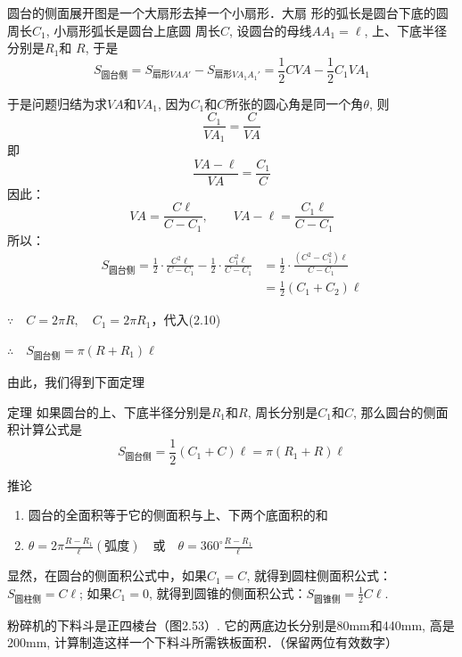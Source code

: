 圆台的侧面展开图是一个大扇形去掉一个小扇形．大扇
形的弧长是圆台下底的圆周长$C_1$, 小扇形弧长是圆台上底圆
周长$C$, 设圆台的母线$AA_1=\ell$, 上、下底半径分别是$R_1$和
$R$, 于是
\[S_{\text{圆台侧}}=S_{\text{扇形}VAA'}-S_{\text{扇形}VA_1A_1'}=\frac{1}{2}CVA-\frac{1}{2}C_1VA_1\]

于是问题归结为求$VA$和$VA_1$, 因为$C_1$和$C$所张的圆心角是同一个角$\theta$, 则
\[\frac{C_1}{VA_1}=\frac{C}{VA}\]
即
\[\frac{VA-\ell}{VA}=\frac{C_1}{C}\]
因此：
\begin{equation}
VA=\frac{C\ell}{C-C_1},\qquad VA-\ell=\frac{C_1\ell}{C-C_1}    
\end{equation}
所以：
\begin{equation}
    \begin{split}
S_{\text{圆台侧}}=\frac{1}{2}\cdot\frac{C^2\ell}{C-C_1}-\frac{1}{2}\cdot \frac{C^2_1\ell}{C-C_1}&=\frac{1}{2}\cdot\frac{(C^2-C^2_1)\ell}{C-C_1}\\
&=\frac{1}{2}(C_1+C_2)\ell        
    \end{split}
\end{equation}

$\because\quad C=2\pi R,\quad  C_1=2\pi R_1$，代入(2.10)

$\therefore\quad S_{\text{圆台侧}}=\pi(R+R_1)\ell$

由此，我们得到下面定理

\begin{blk}
    {定理} 如果圆台的上、下底半径分别是$R_1$和$R$, 周长分别是$C_1$和$C$, 那么圆台的侧面积计算公式是
\[S_{\text{圆台侧}}=\frac{1}{2}(C_1+C)\ell=\pi(R_1+R)\ell \]
\end{blk}

\begin{blk}{推论}
\begin{enumerate}
    \item 圆台的全面积等于它的侧面积与上、下两个底面积的和
    \item $\theta=2\pi\frac{R-R_1}{\ell}(\text{弧度})\quad \text{或}\quad \theta=360^{\circ}\frac{R-R_1}{\ell}$
\end{enumerate}
显然，在圆台的侧面积公式中，如果$C_1=C$, 就得到圆柱侧面积公式：$S_{\text{圆柱侧}}=C\ell$; 如果$C_1=0$, 就得到圆锥的侧面积公式：$S_{\text{圆锥侧}}=\frac{1}{2}C\ell$.
\end{blk}



\begin{example}
粉碎机的下料斗是正四棱台（图2.53）. 它的两底边长分别是80mm和440mm, 高是200mm, 计算制造这样一个下料斗所需铁板面积．（保留两位有效数字）
\end{example}

